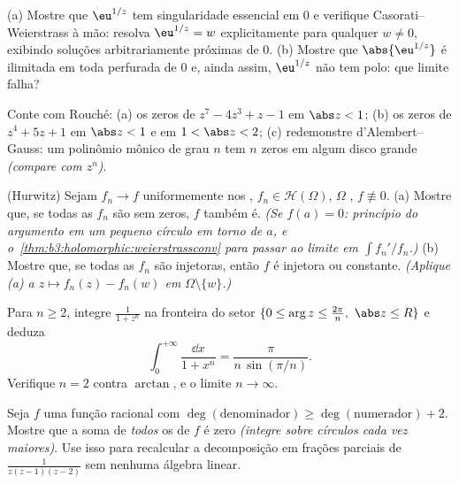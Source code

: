 \begin{exercise}[$\star\star$]\label{exo:b3:residues:6}
(a) Mostre que $\eu^{1/z}$ tem singularidade essencial em $0$ e verifique
Casorati--Weierstrass à mão: resolva $\eu^{1/z} =
w$ explicitamente para qualquer
$w \neq 0$, exibindo soluções arbitrariamente próximas de $0$.
(b) Mostre que $\abs{\eu^{1/z}}$ é ilimitada em toda  perfurada de
$0$ e, ainda assim, $\eu^{1/z}$ não tem polo: que limite falha?
\end{exercise}

\begin{exercise}[$\star\star$]\label{exo:b3:residues:7}
Conte com Rouché:
(a) os zeros de $z^7 - 4z^3 + z - 1$ em $\abs z < 1$;
(b) os zeros de $z^4 + 5z + 1$ em $\abs z < 1$ e em $1 <
\abs z < 2$;
(c) redemonstre d'Alembert--Gauss: um polinômio mônico de grau $n$
tem $n$ zeros em algum disco grande \emph{(compare com $z^n$)}.
\end{exercise}

\begin{exercise}[$\star\star\star$]\label{exo:b3:residues:8}
(Hurwitz) Sejam $f_n \to f$ uniformemente nos , $f_n \in
\mathcal H(\Omega)$, $\Omega$
, $f \not\equiv 0$.
(a) Mostre que, se todas as $f_n$ são sem zeros, $f$ também é.
\emph{(Se $f(a) = 0$: princípio do argumento em um pequeno círculo em torno
de $a$, e o~\cref{thm:b3:holomorphic:weierstrassconv} para passar ao limite em $\int f_n'/f_n$.)}
(b) Mostre que, se todas as $f_n$ são injetoras, então $f$ é
injetora ou constante. \emph{(Aplique (a) a $z \mapsto f_n(z) - f_n(w)$ em $\Omega\setminus\{w\}$.)}
\end{exercise}

\begin{exercise}[$\star\star\star$]\label{exo:b3:residues:9}
Para $n \geq 2$, integre $\frac1{1 + z^n}$ na fronteira do setor $\{0 \leq \arg z \leq \frac{2\pi}n,\ \abs z
\leq R\}$ e deduza
\[
\int_0^{+\infty}\frac{\dd x}{1 + x^n} =
\frac{\pi}{n\,\sin(\pi/n)} .
\]
Verifique $n = 2$ contra $\arctan$, e o limite $n \to
\infty$.
\end{exercise}

\begin{exercise}[$\star\star$]\label{exo:b3:residues:10}
Seja $f$ uma função racional com $\deg(\text{denominador})
\geq \deg(\text{numerador}) + 2$. Mostre que a soma de
\emph{todos} os  de $f$ é zero \emph{(integre sobre círculos
cada vez maiores)}. Use isso para recalcular a decomposição em frações
parciais de $\frac1{z(z-1)(z-2)}$ sem nenhuma álgebra linear.
\end{exercise}

